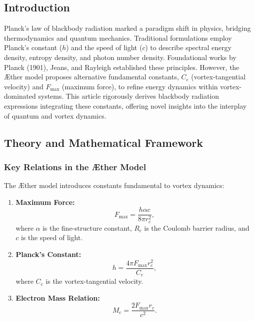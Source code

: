   \subsection*{Introduction}
  Planck's law of blackbody radiation marked a paradigm shift in physics, bridging thermodynamics and quantum mechanics. Traditional formulations employ Planck's constant ($h$) and the speed of light ($c$) to describe spectral energy density, entropy density, and photon number density. Foundational works by Planck (1901), Jeans, and Rayleigh established these principles. However, the Æther model proposes alternative fundamental constants, $C_e$ (vortex-tangential velocity) and $ F_{\max} $ (maximum force), to refine energy dynamics within vortex-dominated systems. This article rigorously derives blackbody radiation expressions integrating these constants, offering novel insights into the interplay of quantum and vortex dynamics.

  \subsection*{Theory and Mathematical Framework}

  \subsubsection*{Key Relations in the Æther Model}
  The Æther model introduces constants fundamental to vortex dynamics:

  \begin{enumerate}
   \item \textbf{Maximum Force:}
   \begin{equation*}
    F_{\max} = \frac{h \alpha c}{8 \pi r_c^2},
   \end{equation*}
   where $\alpha$ is the fine-structure constant, $R_c$ is the Coulomb barrier radius, and $c$ is the speed of light.

   \item \textbf{Planck's Constant:}
   \begin{equation*}
    h = \frac{4 \pi F_{\max} r_c^2}{C_e},
   \end{equation*}
   where $C_e$ is the vortex-tangential velocity.

   \item \textbf{Electron Mass Relation:}
   \begin{equation*}
    M_e = \frac{2 F_{\max} r_c}{c^2}.
   \end{equation*}
  \end{enumerate}

